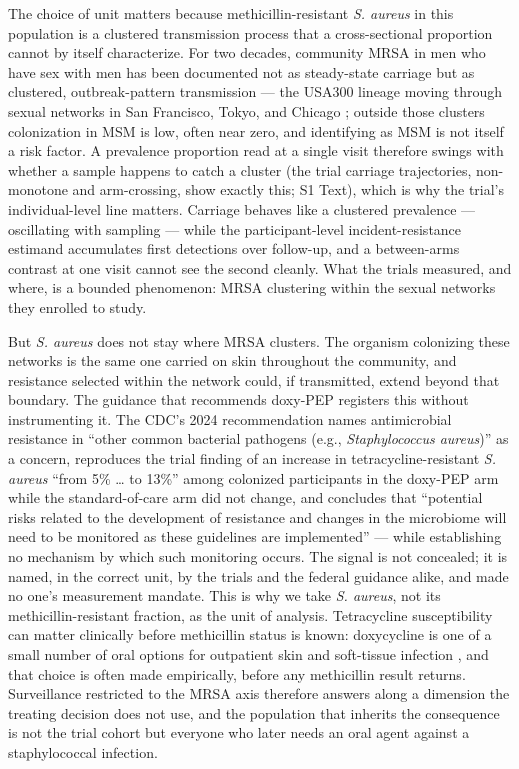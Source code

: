 \documentclass[10pt,letterpaper]{article}
\begin{document}
The choice of unit matters because methicillin-resistant \emph{S.
aureus} in this population is a clustered transmission process that a cross-sectional proportion cannot by itself characterize. For two decades, community MRSA in men who have
sex with men has been documented not as steady-state carriage but as
clustered, outbreak-pattern transmission --- the USA300 lineage moving
through sexual networks in San Francisco, Tokyo, and Chicago
\cite{diep2008, dejong2025}; outside those clusters colonization in MSM
is low, often near zero, and identifying as MSM is not itself a risk
factor. A prevalence proportion read at a single visit therefore swings
with whether a sample happens to catch a cluster (the trial carriage
trajectories, non-monotone and arm-crossing, show exactly this;
S1 Text), which is why the trial's individual-level line
matters. Carriage behaves like a clustered prevalence --- oscillating with sampling --- while the participant-level incident-resistance estimand accumulates first detections over follow-up, and a between-arms
contrast at one visit cannot see the second cleanly. What the trials
measured, and where, is a bounded phenomenon: MRSA clustering within the
sexual networks they enrolled to study.

But \emph{S. aureus} does not stay where MRSA clusters. The organism
colonizing these networks is the same one carried on skin throughout the
community, and resistance selected within the network could, if transmitted, extend beyond that boundary. The guidance that recommends doxy-PEP registers this
without instrumenting it. The CDC's 2024 recommendation names
antimicrobial resistance in ``other common bacterial pathogens (e.g.,
\emph{Staphylococcus aureus})'' as a concern, reproduces the trial
finding of an increase in tetracycline-resistant \emph{S. aureus} ``from
5\% \ldots{} to 13\%'' among colonized participants in the doxy-PEP arm
while the standard-of-care arm did not change, and concludes that
``potential risks related to the development of resistance and changes
in the microbiome will need to be monitored as these guidelines are
implemented'' \cite{cdc2024doxypep} --- while establishing no mechanism
by which such monitoring occurs. The signal is not concealed; it is
named, in the correct unit, by the trials and the federal guidance
alike, and made no one's measurement mandate. This is why we take
\emph{S. aureus}, not its methicillin-resistant fraction, as the unit of
analysis. Tetracycline susceptibility can matter clinically before
methicillin status is known: doxycycline is one of a small number of
oral options for outpatient skin and soft-tissue infection
\cite{stevens2014, liu2011}, and that choice is often made empirically,
before any methicillin result returns. Surveillance restricted to the
MRSA axis therefore answers along a dimension the treating decision does
not use, and the population that inherits the consequence is not the
trial cohort but everyone who later needs an oral agent against a
staphylococcal infection.
\end{document}
